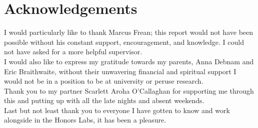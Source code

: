 \chapter*{Acknowledgements}
\thispagestyle{empty}
I would particularly like to thank Marcus Frean; this report would not have been possible without his constant support, encouragement, and knowledge. I could not have asked for a more helpful supervisor.\\

I would also like to express my gratitude towards my parents, Anna Debnam and Eric Braithwaite, without their unwavering financial and spiritual support I would not be in a position to be at university or peruse research.\\

Thank you to my partner Scarlett Aroha O'Callaghan for supporting me through this and putting up with all the late nights and absent weekends.\\

Last but not least thank you to everyone I have gotten to know and work alongside in the Honors Labs, it has been a pleasure.\\


